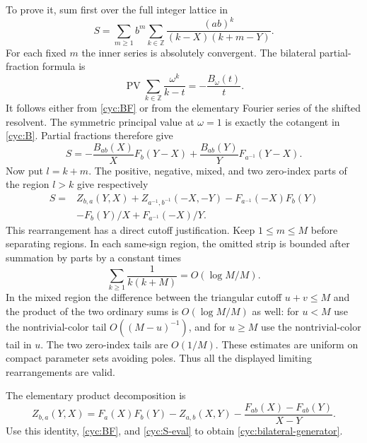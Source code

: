 \documentclass[11pt,a4paper]{article}
\numberwithin{equation}{section}
\theoremstyle{definition}
\theoremstyle{remark}
\begin{document}
To prove it, sum first over the full integer lattice in
\[
 S=\sum_{m\ge1}b^m\sum_{k\in\mathbb Z}
       \frac{(ab)^k}{(k-X)(k+m-Y)}.
\]
For each fixed $m$ the inner series is absolutely convergent.  The
bilateral partial-fraction formula is
\[
 \operatorname{PV}\sum_{k\in\mathbb Z}\frac{\omega^k}{k-t}
                  =-\frac{B_\omega(t)}t.
\]
It follows either from \eqref{cyc:BF} or from the elementary
Fourier series of the shifted resolvent.  The symmetric principal
value at $\omega=1$ is exactly the cotangent in \eqref{cyc:B}.
Partial fractions therefore give
\begin{equation}\label{cyc:S-eval}
 S=-\frac{B_{ab}(X)}X F_b(Y-X)
                  +\frac{B_{ab}(Y)}YF_{a^{-1}}(Y-X).
\end{equation}
Now put $l=k+m$.  The positive, negative, mixed, and two zero-index
parts of the region $l>k$ give respectively
\begin{align*}
 S={}&Z_{b,a}(Y,X)+Z_{a^{-1},b^{-1}}(-X,-Y)
       -F_{a^{-1}}(-X)F_b(Y)\\
    &-F_b(Y)/X+F_{a^{-1}}(-X)/Y.
\end{align*}
This rearrangement has a direct cutoff justification.  Keep
$1\le m\le M$ before separating regions.  In each same-sign region,
the omitted strip is bounded after summation by parts by a constant
times
\[
 \sum_{k\ge1}\frac1{k(k+M)}=O(\log M/M).
\]
In the mixed region the difference between the triangular cutoff
$u+v\le M$ and the product of the two ordinary sums is
$O(\log M/M)$ as well: for $u<M$ use the nontrivial-color tail
$O((M-u)^{-1})$, and for $u\ge M$ use the nontrivial-color tail in
$u$.  The two zero-index tails are $O(1/M)$.  These estimates are
uniform on compact parameter sets avoiding poles.  Thus all the
displayed limiting rearrangements are valid.

The elementary product decomposition is
\[
 Z_{b,a}(Y,X)=F_a(X)F_b(Y)-Z_{a,b}(X,Y)
                    -\frac{F_{ab}(X)-F_{ab}(Y)}{X-Y}.
\]
Use this identity, \eqref{cyc:BF}, and \eqref{cyc:S-eval} to obtain
\eqref{cyc:bilateral-generator}.
\end{document}
